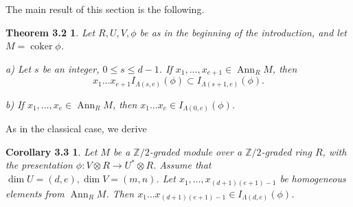 \documentclass{tran-l}
\theoremstyle{plain}
\newtheorem*{theorem15}{Theorem 3.2}
\newtheorem*{theorem16}{Corollary 3.3}
\theoremstyle{remark}
\theoremstyle{definition}
\newcommand{\Ann}{\operatorname{Ann}}
\newcommand{\coker}{\operatorname{coker}}
\newcommand{\ZZ}{\mathbb {Z}}
\begin{document}
The main result of this section is the following. 

\begin{theorem15} Let $R, U, V, \phi $ be as in 
the beginning of the introduction, and let $M=\coker \phi $.

\textup{a)} Let $s$ be an integer, $0\le s\le d-1$. 
If $x_{1} ,\ldots ,x_{e+1}\in \Ann_{R} M$, 
then 
\begin{equation*}x_{1}\ldots x_{e+1}I_{\Lambda (s,e)}(\phi )\subset I_{\Lambda
(s+1,e)}(\phi ). 
\end{equation*}

\textup{b)} If $x_{1} ,\ldots ,x_{e} \in \Ann_{R} M$, then
$x_{1}\ldots x_{e}\in I_{\Lambda (0,e)}(\phi )$.
\end{theorem15}


As in the classical case, we derive

\begin{theorem16} Let $M$ be a 
$\ZZ /2$-graded module over a $\ZZ /2$-graded ring $R$,
with the presentation
$\phi :V\otimes R\rightarrow U^{*}\otimes R$. 
Assume that $\dim U = (d,e), \dim V=(m,n)$. Let
$x_{1} ,\ldots ,x_{(d+1)(e+1)-1}$ be  homogeneous elements from
$\Ann_{R} M$. Then $x_{1} \ldots x_{(d+1)(e+1)-1}\in I_{\Lambda (d,e)}(\phi )$.
\end{theorem16}
\end{document}
